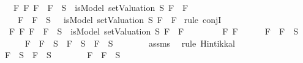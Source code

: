 \begin{isabellebody}
\ \ \ {\isachardoublequoteopen}{\isasymAnd}F{}\ F{}{\isachardot}\ {\isacharparenleft}F{}\ \isactrlbold {\isasymor}\ F{}\ {\isasymin}\ S\ {\isasymlongrightarrow}\ isModel\ {\isacharparenleft}setValuation\ S{\isacharparenright}\ {\isacharparenleft}F{}\ \isactrlbold {\isasymor}\ F{}{\isacharparenright}{\isacharparenright}\ \isanewline
\ \ {\isasymand}\ {\isacharparenleft}\isactrlbold {\isasymnot}\ {\isacharparenleft}F{}\ \isactrlbold {\isasymor}\ F{}{\isacharparenright}\ {\isasymin}\ S\ {\isasymlongrightarrow}\ {\isasymnot}\ isModel\ {\isacharparenleft}setValuation\ S{\isacharparenright}\ {\isacharparenleft}F{}\ \isactrlbold {\isasymor}\ F{}{\isacharparenright}{\isacharparenright}{\isachardoublequoteclose}\isanewline
%
\isadelimproof
%
\endisadelimproof
%
\isatagproof
{}\isamarkupfalse%
\ {\isacharparenleft}rule\ conjI{\isacharparenright}\isanewline
\ \ \isamarkupfalse%
\ {\isachardoublequoteopen}{\isasymAnd}\ F{}\ F{}{\isachardot}\ F{}\ \isactrlbold {\isasymor}\ F{}\ {\isasymin}\ S\ {\isasymlongrightarrow}\ isModel\ {\isacharparenleft}setValuation\ S{\isacharparenright}\ {\isacharparenleft}F{}\ \isactrlbold {\isasymor}\ F{}{\isacharparenright}{\isachardoublequoteclose}\isanewline
\ \ \isamarkupfalse%
\isanewline
\ \ \ \ \isamarkupfalse%
\ F{}\ F{}\isanewline
\ \ \ \ \isamarkupfalse%
\ {\isachardoublequoteopen}F{}\ \isactrlbold {\isasymor}\ F{}\ {\isasymin}\ S{\isachardoublequoteclose}\isanewline
\ \ \ \ \isamarkupfalse%
\ {\isachardoublequoteopen}F{}\ \isactrlbold {\isasymor}\ F{}\ {\isasymin}\ S\ {\isasymlongrightarrow}\ F{}\ {\isasymin}\ S\ {\isasymor}\ F{}\ {\isasymin}\ S{\isachardoublequoteclose}\isanewline
\ \ \ \ \ \ \isamarkupfalse%
\ assms{\isacharparenleft}{}{\isacharparenright}\ \isamarkupfalse%
\ {\isacharparenleft}rule\ Hintikka{\isacharunderscore}l{}{\isacharparenright}\isanewline
\ \ \ \ \isamarkupfalse%
\ \isamarkupfalse%
\ {\isachardoublequoteopen}F{}\ {\isasymin}\ S\ {\isasymor}\ F{}\ {\isasymin}\ S{\isachardoublequoteclose}\isanewline
\ \ \ \ \ \ \isamarkupfalse%
\ {\isacartoucheopen}F{}\ \isactrlbold {\isasymor}\ F{}\ {\isasymin}\ S{\isacartoucheclose}\ \isamarkupfalse%

\end{isabellebody}
